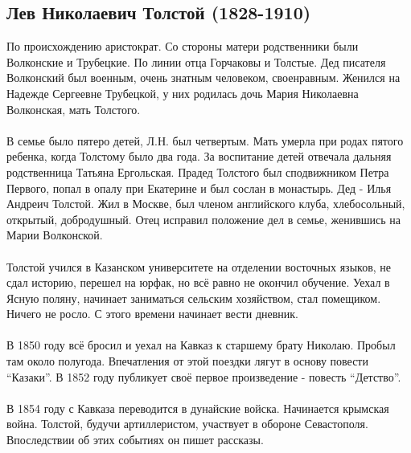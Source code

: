 \documentclass{article}
\begin{document}
\subsection{Лев Николаевич Толстой (1828-1910)}

По происхождению аристократ. Со стороны матери родственники были Волконские и Трубецкие.
По линии отца Горчаковы и Толстые. Дед писателя Волконский был военным, очень знатным человеком, своенравным.
Женился на Надежде Сергеевне Трубецкой, у них родилась дочь Мария Николаевна Волконская, мать Толстого.

\paragraph{}

В семье было пятеро детей, Л.Н. был четвертым. Мать умерла при родах пятого ребенка, когда Толстому было два года.
За воспитание детей отвечала дальняя родственница Татьяна Ергольская. 
Прадед Толстого был сподвижником Петра Первого, попал в опалу при Екатерине и был сослан в монастырь.
Дед - Илья Андреич Толстой. Жил в Москве, был членом английского клуба, хлебосольный, открытый, добродушный.
Отец исправил положение дел в семье, женившись на Марии Волконской.

\paragraph{}

Толстой учился в Казанском университете на отделении восточных языков, не сдал историю, перешел на юрфак, но
всё равно не окончил обучение. Уехал в Ясную поляну, начинает заниматься сельским хозяйством, стал помещиком.
Ничего не росло. С этого времени начинает вести дневник.

\paragraph{}

В 1850 году всё бросил и уехал на Кавказ к старшему брату Николаю. Пробыл там около полугода.
Впечатления от этой поездки лягут в основу повести ``Казаки''.
В 1852 году публикует своё первое произведение - повесть ``Детство''.

\paragraph{}

В 1854 году с Кавказа переводится в дунайские войска. Начинается крымская война. Толстой, будучи артиллеристом,
участвует в обороне Севастополя. Впоследствии об этих событиях он пишет рассказы.
\end{document}

